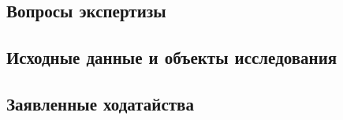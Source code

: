 \documentclass[a4paper,12pt]{report}
\begin{document}
%	
%
\pagestyle{plain}

\pagestyle{fancy}
\frenchspacing 
\fancyhf{}
\fancyhead{}
\fancyfoot{} 
%
%
%
%
\fancyhead[RE]{ } %
\fancyhead{}
\fancyhead[RE]{\small \NomerDoc} %
%

\fancyfoot[R]{\textcolor{black}{ \textit{{\small }} \rule{3cm}{0.1 mm}}}

\fancyfoot[CE]{\thepage}%
\fancyfoot[CO]{\thepage}
%
\renewcommand{\headrulewidth}{0 mm}%
\renewcommand{\headrule}{\hbox to\headwidth{%
		\color{red}\leaders\hrule height \headrulewidth\hfill}}

\renewcommand{\footrulewidth}{0 mm}%
\futurelet\TMPfootrule\def\footrule{{\color{black}\TMPfootrule}}
%
%
\thispagestyle{empty}  %
%

%






\subsection{Вопросы экспертизы}


\subsection{Исходные данные и объекты исследования}


\subsection{Заявленные ходатайства}

\end{document}
